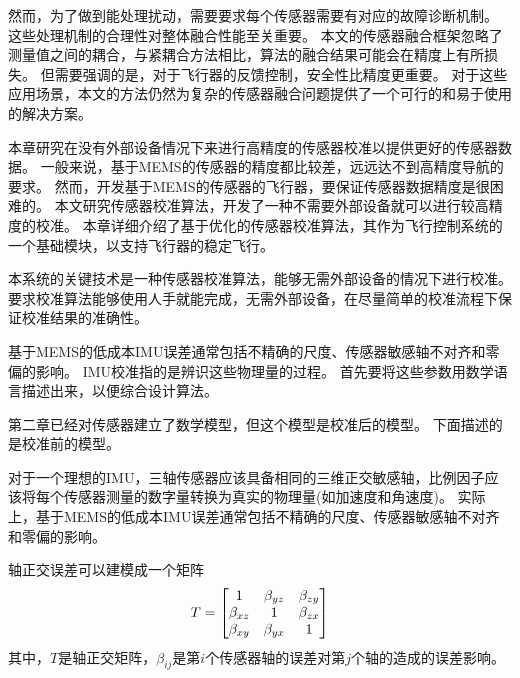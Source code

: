 \documentclass[
  type=master
]{gdutthesis}
\begin{document}
然而，为了做到能处理扰动，需要要求每个传感器需要有对应的故障诊断机制。
这些处理机制的合理性对整体融合性能至关重要。
本文的传感器融合框架忽略了测量值之间的耦合，与紧耦合方法相比，算法的融合结果可能会在精度上有所损失\cite{indelman2013incremental}。
但需要强调的是，对于飞行器的反馈控制，安全性比精度更重要。
对于这些应用场景，本文的方法仍然为复杂的传感器融合问题提供了一个可行的和易于使用的解决方案。

本章研究在没有外部设备情况下来进行高精度的传感器校准以提供更好的传感器数据。
一般来说，基于MEMS的传感器的精度都比较差，远远达不到高精度导航的要求。
然而，开发基于MEMS的传感器的飞行器，要保证传感器数据精度是很困难的。
本文研究传感器校准算法，开发了一种不需要外部设备就可以进行较高精度的校准。
本章详细介绍了基于优化的传感器校准算法，其作为飞行控制系统的一个基础模块，以支持飞行器的稳定飞行。

本系统的关键技术是一种传感器校准算法，能够无需外部设备的情况下进行校准。
要求校准算法能够使用人手就能完成，无需外部设备，在尽量简单的校准流程下保证校准结果的准确性。

基于MEMS的低成本IMU误差通常包括不精确的尺度、传感器敏感轴不对齐和零偏的影响。
IMU校准指的是辨识这些物理量的过程。
首先要将这些参数用数学语言描述出来，以便综合设计算法。

第二章已经对传感器建立了数学模型，但这个模型是校准后的模型。
下面描述的是校准前的模型。

对于一个理想的IMU，三轴传感器应该具备相同的三维正交敏感轴，比例因子应该将每个传感器测量的数字量转换为真实的物理量(如加速度和角速度)。
实际上，基于MEMS的低成本IMU误差通常包括不精确的尺度、传感器敏感轴不对齐和零偏的影响。

轴正交误差可以建模成一个矩阵
\begin{equation}\label{eq:axiserror}
	T=
	\begin{bmatrix}
		1 & \beta_{yz} & \beta_{zy}\\
		\beta_{xz} & 1 & \beta_{zx}\\
		\beta_{xy} & \beta_{yx} & 1
	\end{bmatrix}\vspace{1ex}
\end{equation}
其中，$T$是轴正交矩阵，$\beta_{ij}$是第$i$个传感器轴的误差对第$j$个轴的造成的误差影响。
\end{document}
